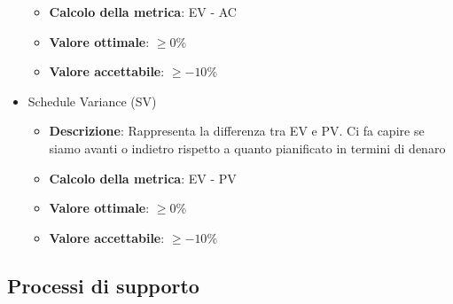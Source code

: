 \documentclass[12pt]{article}
\begin{document}
\begin{itemize}
\begin{itemize}
		      \item \textbf{Calcolo della metrica}:  EV - AC
		      \item \textbf{Valore ottimale}: $\ge 0\%$
		      \item \textbf{Valore accettabile}: $\ge -10\%$
	      \end{itemize}
	\item Schedule Variance (SV)
	      \begin{itemize}
		      \item \textbf{Descrizione}: Rappresenta la differenza tra EV e PV. Ci fa capire se siamo avanti o indietro rispetto a quanto pianificato in termini di denaro
		      \item \textbf{Calcolo della metrica}:  EV - PV
		      \item \textbf{Valore ottimale}: $\ge 0\%$
		      \item \textbf{Valore accettabile}: $\ge -10\%$
	      \end{itemize}
\end{itemize}
\subsection{Processi di supporto}
\end{document}
